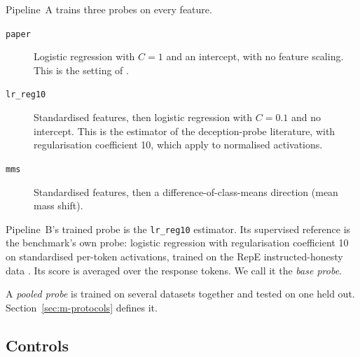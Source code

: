 Pipeline~A trains three probes on every feature. %
\begin{description}
\item[\texttt{paper}] Logistic regression with $C=1$ and an intercept, with no feature scaling. This is the setting of \textcite[p.~4]{mahadik2026persona}. %
\item[\texttt{lr\_reg10}] Standardised features, then logistic regression with $C=0.1$ and no intercept. This is the estimator of the deception-probe literature, with regularisation coefficient 10, which \textcite[p.~3]{goldowskydill2025detecting} apply to normalised activations. %
\item[\texttt{mms}] Standardised features, then a difference-of-class-means direction (mean mass shift). %
\end{description}

Pipeline~B's trained probe is the \texttt{lr\_reg10} estimator. %
Its supervised reference is the benchmark's own probe: logistic regression with regularisation coefficient 10 on standardised per-token activations, trained on the RepE instructed-honesty data \parencite{zou2023representation,goldowskydill2025detecting}. Its score is averaged over the response tokens. %
We call it the \emph{base probe}.

A \emph{pooled probe} is trained on several datasets together and tested on one held out. Section~\ref{sec:m-protocols} defines it.

\subsection{Controls}
\label{sec:m-controls}

